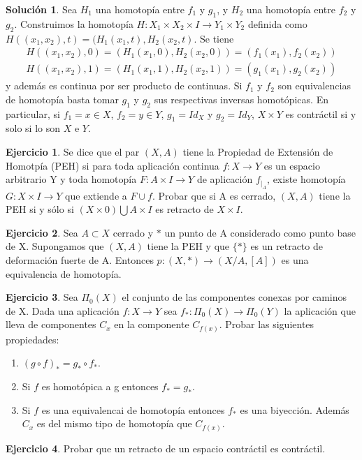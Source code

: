 \documentclass{article}
\theoremstyle{plain}
\theoremstyle{definition}
\newtheorem{exercise}{Ejercicio}
\newtheorem*{sol*}{Solución}
\begin{document}
\begin{sol*}
Sea $H_1$ una homotopía entre $f_1$ y $g_1$, y $H_2$ una homotopía entre $f_2$ y $g_2$. Construimos la homotopía $H:X_1\times X_2\times I\to Y_1\times Y_2$ definida como $H((x_1,x_2),t)=(H_1(x_1,t),H_2(x_2,t)$. Se tiene
\begin{gather*}
H((x_1,x_2),0)=(H_1(x_1,0),H_2(x_2,0))=(f_1(x_1),f_2(x_2))\\
H((x_1,x_2),1)=(H_1(x_1,1),H_2(x_2,1))=(g_1(x_1),g_2(x_2))
\end{gather*}
y además es continua por ser producto de continuas. Si $f_1$ y $f_2$ son equivalencias de homotopía basta tomar $g_1$ y $g_2$ sus respectivas inversas homotópicas. En particular, si $f_1=x\in X$, $f_2=y\in Y$, $g_1=Id_X$ y $g_2=Id_Y$, $X\times Y$ es contráctil si y solo si lo son $X$ e $Y$. 
\end{sol*}
\newpage
\begin{exercise}
Se dice que el par $(X,A)$ tiene la Propiedad de Extensión de Homotpía (PEH) si para toda aplicación continua $f:X\to Y$ es un espacio arbitrario Y y toda homotopía $F:A\times I \to Y$ de aplicación $f_{|_A}$, existe homotopía $G:X\times I \to Y$ que extiende a $F\cup f$. Probar que si A es cerrado, $(X,A)$ tiene la PEH si y sólo si $(X\times 0)\bigcup A\times I$ es retracto de $X\times I$.
\end{exercise}
\newpage
\begin{exercise}
Sea $A\subset X$ cerrado y $*$ un punto de A considerado como punto base de X. Supongamos que $(X,A)$ tiene la PEH y que $\{*\}$ es un retracto de deformación fuerte de A. Entonces $p:(X,*)\to(X/A,[A])$ es una equivalencia de homotopía.
\end{exercise}
\newpage
\begin{exercise}
Sea $\Pi_0(X)$ el conjunto de las componentes conexas por caminos de X. Dada una aplicación $f:X\to Y$ sea $f_*:\Pi_0(X)\to\Pi_0(Y)$ la aplicación que lleva de componentes $C_x$ en la componente $C_{f(x)}$. Probar las siguientes propiedades:
\begin{enumerate}
\item $(g\circ f)_* = g_*\circ f_*$.
\item Si $f$ es homotópica a g entonces $f_*=g_*$.
\item Si $f$ es una equivalencai de homotopía entonces $f_*$ es una biyección. Además $C_x$ es del mismo tipo de homotopía que $C_{f(x)}$.
\end{enumerate}
\end{exercise}
\newpage
\begin{exercise}
Probar que un retracto de un espacio contráctil es contráctil.
\end{exercise}
\end{document}
